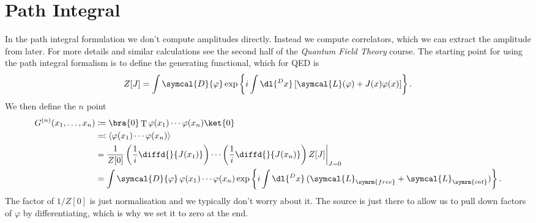 \documentclass[fleqn]{NotesClass}
\newcommand*{\course}[1]{\textit{#1}}
\newcommand{\lagrangianDensity}{\symcal{L}}
\newcommand{\interaction}{{\symrm{int}}}
\DeclareMathOperator{\timeOrdering}{T}
\newcommand{\DL}[1]{\symcal{D}{#1}}
\DeclarePairedDelimiter{\correlator}{\langle}{\rangle}
\begin{document}
    \section{Path Integral}
    In the path integral formulation we don't compute amplitudes directly.
    Instead we compute correlators, which we can extract the amplitude from later.
    For more details and similar calculations see the second half of the \course{Quantum Field Theory} course.
    The starting point for using the path integral formalism is to define the generating functional, which for QED is
    \begin{equation}
        Z[J] = \int \DL{\varphi} \exp\left\{ i\int \dl{^Dx} \, [\lagrangianDensity(\varphi) + J(x)\varphi(x)] \right\}.
    \end{equation}
    We then define the \(n\) point 
    \begin{align}
        G^{(n)}(x_1, \dotsc, x_n) &\coloneqq \bra{0} \timeOrdering \varphi(x_1) \dotsm \varphi(x_n) \ket{0}\\
        &\eqqcolon \correlator{\varphi(x_1) \dotsm \varphi(x_n)}\\
        &= \frac{1}{Z[0]} \left( \frac{1}{i} \diffd{}{J(x_1)} \right) \dotsm \left( \frac{1}{i} \diffd{}{J(x_n)} \right) Z[J] \bigg|_{J = 0}\\
        &= \int \DL{\varphi} \, \varphi(x_1) \dotsm \varphi(x_n) \exp\left\{ i \int \dl{^Dx} \, (\lagrangianDensity_{\symrm{free}} + \lagrangianDensity_{\interaction}) \right\}.\notag
    \end{align}
    The factor of \(1/Z[0]\) is just normalisation and we typically don't worry about it.
    The source is just there to allow us to pull down factors of \(\varphi\) by differentiating, which is why we set it to zero at the end.
    
\end{document}
